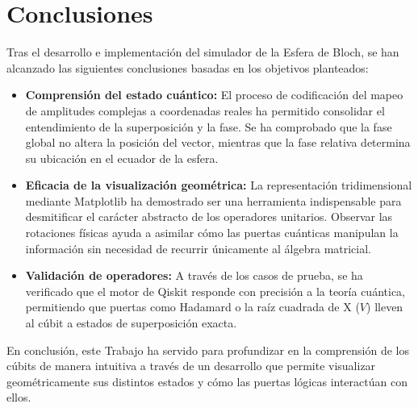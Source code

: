 \documentclass[11pt,a4paper,spanish]{book}
\begin{document}
\chapter{Conclusiones}

Tras el desarrollo e implementación del simulador de la Esfera de Bloch, se han alcanzado las siguientes conclusiones basadas en los objetivos planteados:

\begin{itemize}
    \item \textbf{Comprensión del estado cuántico:} El proceso de codificación del mapeo de amplitudes complejas a coordenadas reales ha permitido consolidar el entendimiento de la superposición y la fase. Se ha comprobado que la fase global no altera la posición del vector, mientras que la fase relativa determina su ubicación en el ecuador de la esfera.

    \item \textbf{Eficacia de la visualización geométrica:} La representación tridimensional mediante Matplotlib ha demostrado ser una herramienta indispensable para desmitificar el carácter abstracto de los operadores unitarios. Observar las rotaciones físicas ayuda a asimilar cómo las puertas cuánticas manipulan la información sin necesidad de recurrir únicamente al álgebra matricial.

    \item \textbf{Validación de operadores:} A través de los casos de prueba, se ha verificado que el motor de Qiskit responde con precisión a la teoría cuántica, permitiendo que puertas como Hadamard o la raíz cuadrada de X ($V$) lleven al cúbit a estados de superposición exacta.
\end{itemize}

En conclusión, este Trabajo ha servido para profundizar en la comprensión de los cúbits de manera intuitiva a través de un desarrollo que permite visualizar geométricamente sus distintos estados y cómo las puertas lógicas interactúan con ellos.
\end{document}

